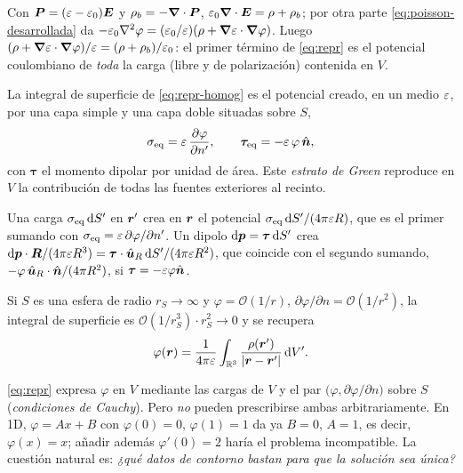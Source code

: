 \documentclass[11pt,a4paper,twoside]{article}
\begin{document}
\begin{observacion}
Con $\bm{P}=(\varepsilon-\varepsilon_{0})\bm{E}$ y $\rho_b=-\bm{\nabla}\cdot\bm{P}$,
$\varepsilon_{0}\bm{\nabla}\cdot\bm{E}=\rho+\rho_b$; por otra parte \eqref{eq:poisson-desarrollada} da
$-\varepsilon_{0}\nabla^{2}\varphi=(\varepsilon_{0}/\varepsilon)(\rho+\bm{\nabla}\varepsilon\cdot\bm{\nabla}\varphi)$. Luego
$(\rho+\bm{\nabla}\varepsilon\cdot\bm{\nabla}\varphi)/\varepsilon=(\rho+\rho_b)/\varepsilon_{0}$: el primer término de
\eqref{eq:repr} es el potencial coulombiano de \emph{toda} la carga (libre y de polarización)
contenida en $V$.
\end{observacion}

\begin{proposicion}\label{prop:estrato}
La integral de superficie de \eqref{eq:repr-homog} es el potencial creado, en un medio
$\varepsilon$, por una capa simple y una capa doble situadas sobre $S$,
\begin{equation}\label{eq:estrato}
  \sigma_{\mathrm{eq}}=\varepsilon\,\frac{\partial \varphi}{\partial n'},\qquad
  \bm\tau_{\mathrm{eq}}=-\varepsilon\,\varphi\,\hat{\bm{n}} ,
\end{equation}
con $\bm\tau$ el momento dipolar por unidad de área. Este \emph{estrato de Green} reproduce en
$V$ la contribución de todas las fuentes exteriores al recinto.
\end{proposicion}

\begin{demostracion}
Una carga $\sigma_{\mathrm{eq}}\,\mathrm{d} S'$ en $\bm{r}'$ crea en $\bm{r}$ el potencial
$\sigma_{\mathrm{eq}}\,\mathrm{d} S'/(4\pi\varepsilon R)$, que es el primer sumando con
$\sigma_{\mathrm{eq}}=\varepsilon\,\partial\varphi/\partial n'$. Un dipolo $\mathrm{d}\bm p=\bm\tau\,\mathrm{d} S'$
crea $\mathrm{d}\bm p\cdot\bm{R}/(4\pi\varepsilon R^{3})=\bm\tau\cdot\hat{\bm{u}}_{R}\,\mathrm{d} S'/(4\pi\varepsilon R^{2})$, que coincide
con el segundo sumando, $-\varphi\,\hat{\bm{u}}_{R}\cdot\hat{\bm{n}}/(4\pi R^{2})$, si $\bm\tau=-\varepsilon\varphi\hat{\bm{n}}$.
\end{demostracion}

\begin{corolario}\label{cor:infinito}
Si $S$ es una esfera de radio $r_S\to\infty$ y $\varphi=\mathcal O(1/r)$,
$\partial\varphi/\partial n=\mathcal O(1/r^{2})$, la integral de superficie es
$\mathcal O(1/r_S^{3})\cdot r_S^{2}\to0$ y se recupera
\begin{equation}\label{eq:repr-inf}
  \varphi(\bm{r})=\frac{1}{4\pi\varepsilon}\int_{\mathbb{R}^{3}}\frac{\rho(\bm{r}')}{\left\lvert \bm{r}-\bm{r}'\right\rvert}\,\mathrm{d} V' .
\end{equation}
\end{corolario}

\begin{observacion}
\eqref{eq:repr} expresa $\varphi$ en $V$ mediante las cargas de $V$ y el par
$\bigl(\varphi,\partial\varphi/\partial n\bigr)$ sobre $S$ (\emph{condiciones de Cauchy}). Pero
\emph{no} pueden prescribirse ambas arbitrariamente. En 1D, $\varphi=Ax+B$ con $\varphi(0)=0$,
$\varphi(1)=1$ da ya $B=0$, $A=1$, es decir, $\varphi(x)=x$; añadir además $\varphi'(0)=2$
haría el problema incompatible. La cuestión natural es: \emph{¿qué datos de contorno bastan
para que la solución sea única?}
\end{observacion}
\end{document}

